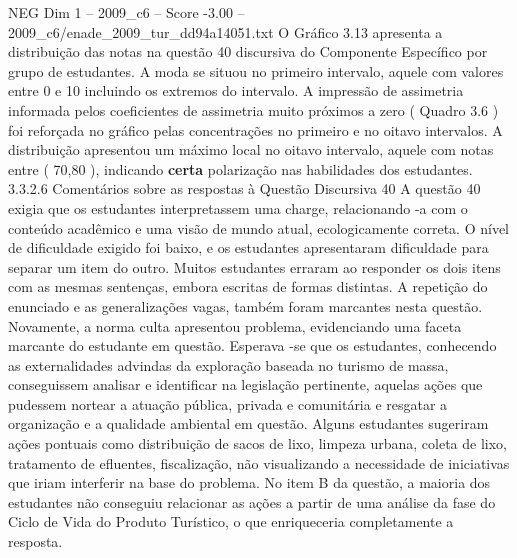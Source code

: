 \begin{textsample}{NEG Dim 1 – 2009\_c6 – Score -3.00 – 2009\_c6/enade\_2009\_tur\_dd94a14051.txt}
O Gráfico 3.13 apresenta a distribuição das notas na questão 40 discursiva do Componente Específico por grupo de estudantes.
A moda se situou no primeiro intervalo, aquele com valores entre 0 e 10 incluindo os extremos do intervalo.
A impressão de assimetria informada pelos coeficientes de assimetria muito próximos a zero ( Quadro 3.6 ) foi reforçada no gráfico pelas concentrações no primeiro e no oitavo intervalos.
A distribuição apresentou um máximo local no oitavo intervalo, aquele com notas entre ( 70,80 ), indicando \textbf{certa} polarização nas habilidades dos estudantes. 3.3.2.6 Comentários sobre as respostas à Questão Discursiva 40 A questão 40 exigia que os estudantes interpretassem uma charge, relacionando -a com o conteúdo acadêmico e uma visão de mundo atual, ecologicamente correta.
O nível de dificuldade exigido foi baixo, e os estudantes apresentaram dificuldade para separar um item do outro.
Muitos estudantes erraram ao responder os dois itens com as mesmas sentenças, embora escritas de formas distintas.
A repetição do enunciado e as generalizações vagas, também foram marcantes nesta questão.
Novamente, a norma culta apresentou problema, evidenciando uma faceta marcante do estudante em questão.
Esperava -se que os estudantes, conhecendo as externalidades advindas da exploração baseada no turismo de massa, conseguissem analisar e identificar na legislação pertinente, aquelas ações que pudessem nortear a atuação pública, privada e comunitária e resgatar a organização e a qualidade ambiental em questão.
Alguns estudantes sugeriram ações pontuais como distribuição de sacos de lixo, limpeza urbana, coleta de lixo, tratamento de efluentes, fiscalização, não visualizando a necessidade de iniciativas que iriam interferir na base do problema.
No item B da questão, a maioria dos estudantes não conseguiu relacionar as ações a partir de uma análise da fase do Ciclo de Vida do Produto Turístico, o que enriqueceria completamente a resposta.

\end{textsample}
